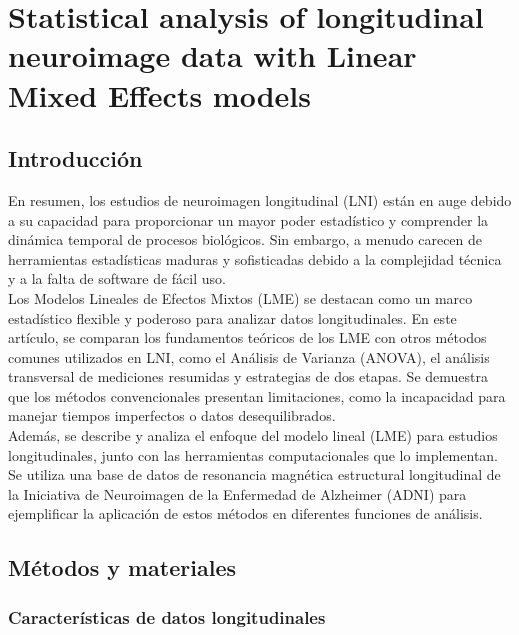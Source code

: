 	
	
	
	\section{Statistical analysis of longitudinal neuroimage data with Linear Mixed Effects models}
	
	
	\subsection{Introducción}
	En resumen, los estudios de neuroimagen longitudinal (LNI) están en auge debido a su capacidad para proporcionar un mayor poder estadístico y comprender la dinámica temporal de procesos biológicos. Sin embargo, a menudo carecen de herramientas estadísticas maduras y sofisticadas debido a la complejidad técnica y a la falta de software de fácil uso.\\
	
	Los Modelos Lineales de Efectos Mixtos (LME) se destacan como un marco estadístico flexible y poderoso para analizar datos longitudinales. En este artículo, se comparan los fundamentos teóricos de los LME con otros métodos comunes utilizados en LNI, como el Análisis de Varianza (ANOVA), el análisis transversal de mediciones resumidas y estrategias de dos etapas. Se demuestra que los métodos convencionales presentan limitaciones, como la incapacidad para manejar tiempos imperfectos o datos desequilibrados.\\
	
	Además, se describe y analiza el enfoque del modelo lineal (LME) para estudios longitudinales, junto con las herramientas computacionales que lo implementan. Se utiliza una base de datos de resonancia magnética estructural longitudinal de la Iniciativa de Neuroimagen de la Enfermedad de Alzheimer (ADNI) para ejemplificar la aplicación de estos métodos en diferentes funciones de análisis.\cite{bernal2013statistical}
	
	\subsection{Métodos y materiales}
	\subsubsection{Características de datos longitudinales}
	
